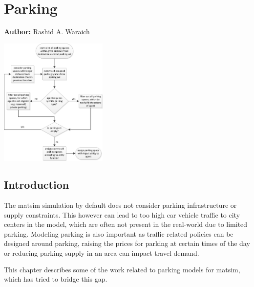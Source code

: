 \chapter{Parking}
\label{ch:parking}

\hfill \textbf{Author:} Rashid A. Waraich

\begin{center} \includegraphics[width=0.4\textwidth, angle=0]{extending/figures/Parking/parking_algo.png} \end{center}


\section{Introduction} 
The \gls{matsim} simulation by default does not consider parking infrastructure or supply constraints. This however can lead to too high car vehicle traffic to city centers in the model, which are often not present in the real-world due to limited parking. Modeling parking is also important as traffic related policies can be designed around parking, \eg raising the prices for parking at certain times of the day or reducing parking supply in an area can impact travel demand. 

This chapter describes some of the work related to parking models for \gls{matsim}, which has tried to bridge this gap.

